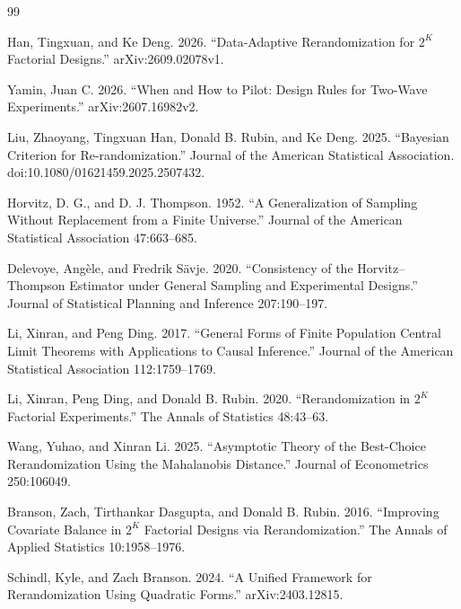 \documentclass{article}
\begin{document}
\begin{thebibliography}{99}

   Han, Tingxuan, and Ke Deng. 2026. ``Data-Adaptive Rerandomization for \(2^{K}\) Factorial Designs.'' arXiv:2609.02078v1.

   Yamin, Juan C. 2026. ``When and How to Pilot: Design Rules for Two-Wave Experiments.'' arXiv:2607.16982v2.

   Liu, Zhaoyang, Tingxuan Han, Donald B. Rubin, and Ke Deng. 2025. ``Bayesian Criterion for Re-randomization.'' Journal of the American Statistical Association. doi:10.1080/01621459.2025.2507432.

   Horvitz, D. G., and D. J. Thompson. 1952. ``A Generalization of Sampling Without Replacement from a Finite Universe.'' Journal of the American Statistical Association 47:663--685.

   Delevoye, Angèle, and Fredrik Sävje. 2020. ``Consistency of the Horvitz--Thompson Estimator under General Sampling and Experimental Designs.'' Journal of Statistical Planning and Inference 207:190--197.

   Li, Xinran, and Peng Ding. 2017. ``General Forms of Finite Population Central Limit Theorems with Applications to Causal Inference.'' Journal of the American Statistical Association 112:1759--1769.

   Li, Xinran, Peng Ding, and Donald B. Rubin. 2020. ``Rerandomization in \(2^{K}\) Factorial Experiments.'' The Annals of Statistics 48:43--63.

   Wang, Yuhao, and Xinran Li. 2025. ``Asymptotic Theory of the Best-Choice Rerandomization Using the Mahalanobis Distance.'' Journal of Econometrics 250:106049.

   Branson, Zach, Tirthankar Dasgupta, and Donald B. Rubin. 2016. ``Improving Covariate Balance in \(2^{K}\) Factorial Designs via Rerandomization.'' The Annals of Applied Statistics 10:1958--1976.

   Schindl, Kyle, and Zach Branson. 2024. ``A Unified Framework for Rerandomization Using Quadratic Forms.'' arXiv:2403.12815.


\end{thebibliography}
\end{document}
